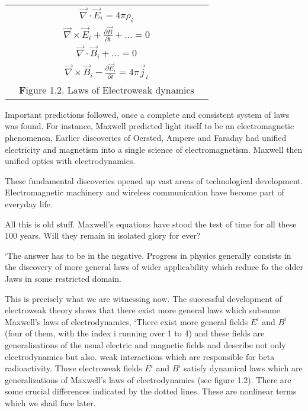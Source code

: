 \begin{center}
\begin{tabular}{ccc}
& $\vec{\nabla} \cdot \vec{E}_{i} = 4 \pi \rho_{i}$ &\\[.2cm]
& $\vec{\nabla} \times \vec{E}_{i} + \frac{\partial \vec{B}}{\partial t}+\ldots = 0$\\[.2cm]
& $\vec{\nabla} \cdot \vec{B}_{i}+ \ldots = 0$&\\[.2cm]
& $\vec{\nabla} \times \vec{B}_{i}- \frac{\partial \vec{E}_{i}}{\partial t} = 4 \pi \vec{j}_{i}$&\\[.2cm]
& {\textbf Figure 1.2.} Laws of Electroweak dynamics &\\[.2cm]
\end{tabular}
\end{center}

Important predictions followed, once a complete and consistent system of laws was found. For
instance, Maxwell predicted light itself to be an electromagnetic phenomenon, Earlier discoveries
of Oersted, Ampere and Faraday had unified electricity and magnetism into a single science of
electromagnetism. Maxwell then unified optics with electrodynamics. 

These fundamental discoveries opened up vast areas of technological development. Electromagnetic machinery and wireless communication have become part of everyday life. 

All this is old stuff. Maxwell’s equations have stood the test of time for all these 100 years. Will they remain in isolated glory for ever? 

‘The answer has to be in the negative. Progress in physics generally consists in the discovery of more general laws of wider applicability which reduce fo the older Jaws in some restricted domain. 

This is precisely what we are witnessing now. The successful development of electroweak theory shows that there exist more general laws which subsume Maxwell’s laws of electrodynamics, ‘There exist more general fields $E^{i}$ and $B^{i}$ (four of them, with the index i running over 1 to 4) and these fields are generalisations of the usual electric and magnetic fields and describe not only electrodynamics but also. weak interactions which are responsible for beta radioactivity. These electroweak fields $E^{i}$ and $B^{i}$ satisfy dynamical laws which are generalizations of Maxwell's laws of electrodynamics (see figure 1.2). There are some crucial differences indicated by the dotted lines. These are nonlinear terms which we shail face later. 

